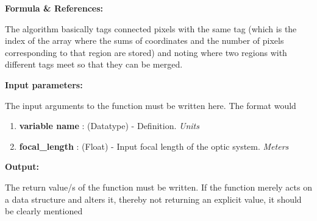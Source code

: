 \documentclass[a4paper, oneside,11pt]{article}
\begin{document}
\textbf{Formula \& References:}

The algorithm basically tags connected pixels with the same tag (which is the index of the array where the sums of coordinates  and the number of pixels corresponding to that region are stored) and noting where two regions with different tags meet so that they can be merged\cite{image_seg}.


\textbf{Input parameters:}

The input arguments to the function must be written here. The format would 
\begin{enumerate}
    \item \textbf{variable name} : (Datatype) - Definition. \textit{Units}
    
    \item \textbf{focal\_length} : (Float) -  Input focal length of the optic system. \textit{Meters}
\end{enumerate} 


\textbf{Output:}

The return value/s of the function must be written. If the function merely acts on a data structure and alters it, thereby not returning an explicit value, it should be clearly mentioned 





\end{document}

